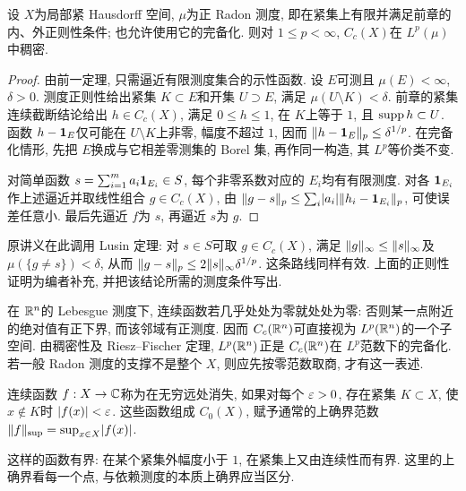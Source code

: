 \begin{theorem}\label{ra:c5:cc-density}
设 $X$为局部紧 Hausdorff 空间, $\mu$为正 Radon 测度, 即在紧集上有限并满足前章的内、外正则性条件; 也允许使用它的完备化. 则对 $1\le p<\infty$, $C_c(X)$在 $L^p(\mu)$中稠密.
\end{theorem}
\begin{proof}
由前一定理, 只需逼近有限测度集合的示性函数. 设 $E$可测且 $\mu(E)<\infty$, $\delta>0$. 测度正则性给出紧集 $K\subset E$和开集 $U\supset E$, 满足 $\mu(U\setminus K)<\delta$. 前章的紧集连续截断结论给出 $h\in C_c(X)$, 满足 $0\le h\le1$, 在 $K$上等于 $1$, 且 $\operatorname{supp} h\subset U$. 函数 $h-\mathbf 1_E$仅可能在 $U\setminus K$上非零, 幅度不超过 $1$, 因而 $\lVert h-\mathbf 1_E\rVert_p\le\delta^{1/p}$. 在完备化情形, 先把 $E$换成与它相差零测集的 Borel 集, 再作同一构造, 其 $L^p$等价类不变.

对简单函数 $s=\sum_{i=1}^m a_i\mathbf 1_{E_i}\in S$, 每个非零系数对应的 $E_i$均有有限测度. 对各 $\mathbf 1_{E_i}$作上述逼近并取线性组合 $g\in C_c(X)$, 由 $\lVert g-s\rVert_p\le\sum_i\lvert a_i\rvert\lVert h_i-\mathbf 1_{E_i}\rVert_p$, 可使误差任意小. 最后先逼近 $f$为 $s$, 再逼近 $s$为 $g$.
\end{proof}

\begin{remark}
原讲义在此调用 Lusin 定理: 对 $s\in S$可取 $g\in C_c(X)$, 满足 $\lVert g\rVert_\infty\le\lVert s\rVert_\infty$及 $\mu(\{g\ne s\})<\delta$, 从而 $\lVert g-s\rVert_p\le2\lVert s\rVert_\infty\delta^{1/p}$. 这条路线同样有效. 上面的正则性证明为编者补充, 并把该结论所需的测度条件写出.
\end{remark}

在 $\mathbb R^n$的 Lebesgue 测度下, 连续函数若几乎处处为零就处处为零: 否则某一点附近的绝对值有正下界, 而该邻域有正测度. 因而 $C_c(\mathbb R^n)$可直接视为 $L^p(\mathbb R^n)$的一个子空间. 由稠密性及 Riesz--Fischer 定理, $L^p(\mathbb R^n)$正是 $C_c(\mathbb R^n)$在 $L^p$范数下的完备化. 若一般 Radon 测度的支撑不是整个 $X$, 则应先按零范数取商, 才有这一表述.

\begin{definition}
连续函数 $f:X\to\mathbb C$称为在无穷远处消失, 如果对每个 $\varepsilon>0$, 存在紧集 $K\subset X$, 使 $x\notin K$时 $\lvert f(x)\rvert<\varepsilon$. 这些函数组成 $C_0(X)$, 赋予通常的上确界范数 $\lVert f\rVert_{\mathrm{sup}}=\sup_{x\in X}\lvert f(x)\rvert$.
\end{definition}

这样的函数有界: 在某个紧集外幅度小于 $1$, 在紧集上又由连续性而有界. 这里的上确界看每一个点, 与依赖测度的本质上确界应当区分.

